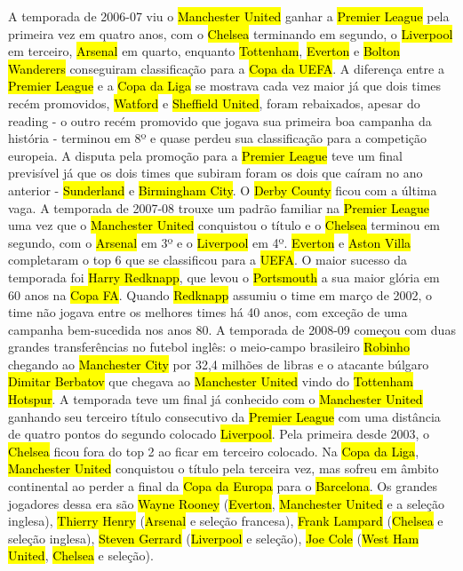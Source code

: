\documentclass[a4paper,12pt]{article}
\begin{document}
A temporada de 2006-07 viu o \hl{Manchester United} ganhar a \hl{Premier League} pela primeira vez em quatro anos, com o \hl{Chelsea} terminando em segundo, o \hl{Liverpool} em terceiro, \hl{Arsenal} em quarto, enquanto \hl{Tottenham}, \hl{Everton} e \hl{Bolton Wanderers} conseguiram classificação para a \hl{Copa da UEFA}.
A diferença entre a \hl{Premier League} e a \hl{Copa da Liga} se mostrava cada vez maior já que dois times recém promovidos, \hl{Watford} e \hl{Sheffield United}, foram rebaixados, apesar do reading - o outro recém promovido que jogava sua primeira boa campanha da história - terminou em 8º e quase perdeu sua classificação para a competição europeia. A disputa pela promoção para a \hl{Premier League} teve um final previsível já que os dois times que subiram foram os dois que caíram no ano anterior - \hl{Sunderland} e \hl{Birmingham City}. O \hl{Derby County} ficou com a última vaga.
A temporada de 2007-08 trouxe um padrão familiar na \hl{Premier League} uma vez que o \hl{Manchester United} conquistou o título e o \hl{Chelsea} terminou em segundo, com o \hl{Arsenal} em 3º e o \hl{Liverpool} em 4º. \hl{Everton} e \hl{Aston Villa} completaram o top 6 que se classificou para a \hl{UEFA}. O maior sucesso da temporada foi \hl{Harry Redknapp}, que levou o \hl{Portsmouth} a sua maior glória em 60 anos na \hl{Copa FA}. Quando \hl{Redknapp} assumiu o time em março de 2002, o time não jogava entre os melhores times há 40 anos, com exceção de uma campanha bem-sucedida nos anos 80.
A temporada de 2008-09 começou com duas grandes transferências no futebol inglês: o meio-campo brasileiro \hl{Robinho} chegando ao \hl{Manchester City} por 32,4 milhões de libras e o atacante búlgaro \hl{Dimitar Berbatov} que chegava ao \hl{Manchester United} vindo do \hl{Tottenham Hotspur}. A temporada teve um final já conhecido com o \hl{Manchester United} ganhando seu terceiro título consecutivo da \hl{Premier League} com uma distância de quatro pontos do segundo colocado \hl{Liverpool}.
Pela primeira desde 2003, o \hl{Chelsea} ficou fora do top 2 ao ficar em terceiro colocado. Na \hl{Copa da Liga}, \hl{Manchester United} conquistou o título pela terceira vez, mas sofreu em âmbito continental ao perder a final da \hl{Copa da Europa} para o \hl{Barcelona}.
Os grandes jogadores dessa era são \hl{Wayne Rooney} (\hl{Everton}, \hl{Manchester United} e a seleção inglesa), \hl{Thierry Henry} (\hl{Arsenal} e seleção francesa), \hl{Frank Lampard} (\hl{Chelsea} e seleção inglesa), \hl{Steven Gerrard} (\hl{Liverpool} e seleção), \hl{Joe Cole} (\hl{West Ham United}, \hl{Chelsea} e seleção).
\end{document}

